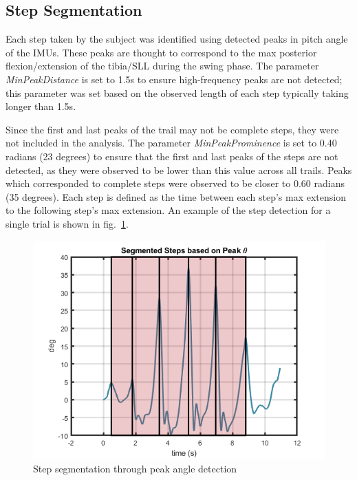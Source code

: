 \documentclass[defaultstyle,11pt]{comps}
\begin{document}
\hypertarget{step-segmentation}{%
\subsection{Step Segmentation}\label{step-segmentation}}

Each step taken by the subject was identified using detected peaks in pitch angle of the IMUs.
These peaks are thought to correspond to the max posterior flexion/extension of the tibia/SLL during the swing phase.
The parameter \emph{MinPeakDistance} is set to 1.5s to ensure high-frequency peaks are not detected; this parameter was set based on the observed length of each step typically taking longer than 1.5s.

Since the first and last peaks of the trail may not be complete steps, they were not included in the analysis.
The parameter \emph{MinPeakProminence} is set to 0.40 radians (23 degrees) to ensure that the first and last peaks of the steps are not detected, as they were observed to be lower than this value across all trails.
Peaks which corresponded to complete steps were observed to be closer to 0.60 radians (35 degrees).
Each step is defined as the time between each step's max extension to the following step's max extension.
An example of the step detection for a single trial is shown in fig.~\ref{fig:SA1-StepSeg}.

\begin{figure}
\hypertarget{fig:SA1-StepSeg}{%
\centering
\includegraphics{../fig/SA1/S3C0T1R_Steps.png}
\caption{Step segmentation through peak angle detection}\label{fig:SA1-StepSeg}
}
\end{figure}
\end{document}
